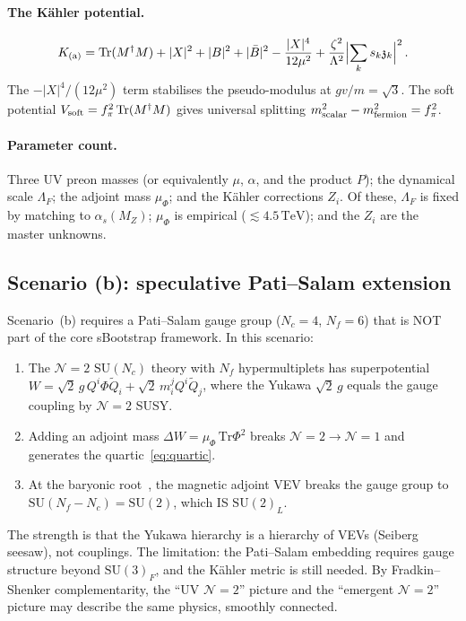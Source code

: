 \documentclass[12pt,a4paper]{article}
\newcommand{\SU}{\mathrm{SU}}
\newcommand{\Nf}{N_{\!f}}
\newcommand{\Nc}{N_{\!c}}
\newcommand{\Tr}{\mathrm{Tr}}
\newcommand{\TeV}{\,\mathrm{TeV}}
\newcommand{\zch}{\mathfrak{z}}
\begin{document}
\paragraph{The K\"ahler potential.}
\begin{equation}
  K_{\rm (a)} = \Tr(M^\dagger M) + |X|^2 + |B|^2 + |\bar{B}|^2
  - \frac{|X|^4}{12\mu^2}
  + \frac{\zeta^2}{\Lambda^2}
    \Bigl|\sum_k s_k \zch_k\Bigr|^2\,.
  \label{eq:Kahler_a}
\end{equation}
The $-|X|^4/(12\mu^2)$ term stabilises the pseudo-modulus at
$gv/m = \sqrt{3}$.
The soft potential $V_{\rm soft} = f_\pi^2\,\Tr(M^\dagger M)$
gives universal splitting
$m^2_{\rm scalar} - m^2_{\rm fermion} = f_\pi^2$.

\paragraph{Parameter count.}
Three UV preon masses (or equivalently $\mu$, $\alpha$, and the
product $P$); the dynamical scale $\Lambda_F$; the adjoint mass
$\mu_\Phi$; and the K\"ahler corrections $Z_i$.
Of these, $\Lambda_F$ is fixed by matching to $\alpha_s(M_Z)$;
$\mu_\Phi$ is empirical ($\lesssim 4.5\TeV$); and the $Z_i$
are the master unknowns.


\subsection{Scenario (b): speculative Pati--Salam extension}

Scenario~(b) requires a Pati--Salam gauge group ($\Nc = 4$,
$\Nf = 6$) that is NOT part of the core sBootstrap framework.
In this scenario:
\begin{enumerate}
  \item The $\mathcal{N}{=}2$ $\SU(\Nc)$ theory with $\Nf$
    hypermultiplets has superpotential~\cite{HMS:1997,Fayet:1976}
    $W = \sqrt{2}\,g\,Q^i\Phi\tilde{Q}_i + \sqrt{2}\,m^j_i
    Q^i\tilde{Q}_j$, where the Yukawa $\sqrt{2}\,g$ equals the
    gauge coupling by $\mathcal{N}{=}2$ SUSY.
  \item Adding an adjoint mass
    $\Delta W = \mu_\Phi\,\Tr\Phi^2$ breaks
    $\mathcal{N}{=}2 \to \mathcal{N}{=}1$ and generates the
    quartic~\eqref{eq:quartic}.
  \item At the baryonic root~\cite{Csaki:2011xn}, the magnetic
    adjoint VEV breaks the gauge group to
    $\SU(\Nf - \Nc) = \SU(2)$, which IS $\SU(2)_L$.
\end{enumerate}
The strength is that the Yukawa hierarchy is a hierarchy of VEVs
(Seiberg seesaw), not couplings.
The limitation: the Pati--Salam embedding requires gauge structure
beyond $\SU(3)_F$, and the K\"ahler metric is still needed.
By Fradkin--Shenker complementarity, the ``UV $\mathcal{N}{=}2$''
picture and the ``emergent $\mathcal{N}{=}2$''
picture may describe the same physics, smoothly connected.
\end{document}
